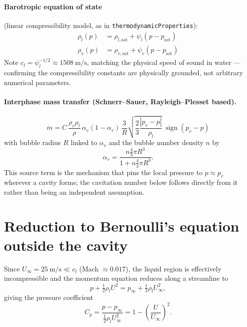 \paragraph{Barotropic equation of state} (linear compressibility model, as in
\texttt{thermodynamicProperties}):
\begin{align}
    \rho_l(p) &= \rho_{l,\text{sat}} + \psi_l (p - p_{\text{sat}}) \\
    \rho_v(p) &= \rho_{v,\text{sat}} + \psi_v (p - p_{\text{sat}})
\end{align}
Note $c_l = \psi_l^{-1/2} \approx 1508\ \text{m/s}$, matching the physical speed of
sound in water — confirming the compressibility constants are physically
grounded, not arbitrary numerical parameters.

\paragraph{Interphase mass transfer (Schnerr--Sauer, Rayleigh--Plesset based).}
\begin{equation}
    \dot m = C\,\frac{\rho_v \rho_l}{\rho}\,\alpha_v(1-\alpha_v)\,\frac{3}{R}
    \sqrt{\frac{2}{3}\frac{|p_v - p|}{\rho_l}}\ \operatorname{sign}(p_v - p)
\end{equation}
with bubble radius $R$ linked to $\alpha_v$ and the bubble number density $n$ by
\begin{equation}
    \alpha_v = \frac{n \tfrac{4}{3}\pi R^3}{1 + n \tfrac{4}{3}\pi R^3}.
\end{equation}
This source term is the mechanism that pins the local pressure to $p \approx p_v$
wherever a cavity forms; the cavitation number below follows directly from it
rather than being an independent assumption.

\section{Reduction to Bernoulli's equation outside the cavity}

Since $U_\infty = 25\ \text{m/s} \ll c_l$ (Mach $\approx 0.017$), the liquid region
is effectively incompressible and the momentum equation reduces along a
streamline to
\begin{equation}
    p + \tfrac12 \rho_l U^2 = p_\infty + \tfrac12 \rho_l U_\infty^2,
\end{equation}
giving the pressure coefficient
\begin{equation}
    C_p = \frac{p - p_\infty}{\tfrac12 \rho_l U_\infty^2} = 1 - \left(\frac{U}{U_\infty}\right)^2.
\end{equation}

